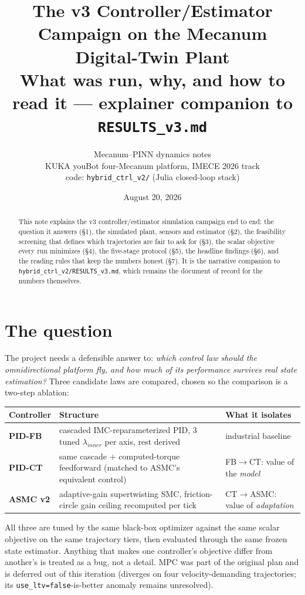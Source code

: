 \documentclass[11pt]{article}
\title{The v3 Controller/Estimator Campaign on the Mecanum Digital-Twin Plant\\
\large What was run, why, and how to read it --- explainer companion to
\texttt{RESULTS\_v3.md}}
\author{Mecanum--PINN dynamics notes\\
\small KUKA youBot four-Mecanum platform, IMECE 2026 track\\
\small code: \texttt{hybrid\_ctrl\_v2/} (Julia closed-loop stack)}
\date{August 20, 2026}
\begin{document}
\maketitle

\begin{abstract}
\noindent
This note explains the v3 controller/estimator simulation campaign end to end: the
question it answers (\S1), the simulated plant, sensors and estimator (\S2), the
feasibility screening that defines which trajectories are fair to ask for (\S3), the
scalar objective every run minimizes (\S4), the five-stage protocol (\S5), the headline
findings (\S6), and the reading rules that keep the numbers honest (\S7). It is the
narrative companion to \texttt{hybrid\_ctrl\_v2/RESULTS\_v3.md}, which remains the
document of record for the numbers themselves.
\end{abstract}

\section{The question}
The project needs a defensible answer to: \emph{which control law should the
omnidirectional platform fly, and how much of its performance survives real state
estimation?} Three candidate laws are compared, chosen so the comparison is a two-step
ablation:

\begin{center}\small
\begin{tabular}{@{}l p{8.6cm} p{4.9cm} @{}}
\toprule
Controller & Structure & What it isolates\\
\midrule
\textbf{PID-FB} & cascaded IMC-reparameterized PID, 3 tuned $\lambda_{inner}$ per axis,
                  rest derived & industrial baseline\\
\textbf{PID-CT} & same cascade $+$ computed-torque feedforward (matched to ASMC's
                  equivalent control) & FB$\to$CT: value of the \emph{model}\\
\textbf{ASMC v2} & adaptive-gain supertwisting SMC, friction-circle gain ceiling
                  recomputed per tick & CT$\to$ASMC: value of \emph{adaptation}\\
\bottomrule
\end{tabular}
\end{center}

All three are tuned by the same black-box optimizer against the same scalar objective on
the same trajectory tiers, then evaluated through the same frozen state estimator.
Anything that makes one controller's objective differ from another's is treated as a bug,
not a detail. MPC was part of the original plan and is deferred out of this iteration
(diverges on four velocity-demanding trajectories; its \texttt{use\_ltv=false}-is-better
anomaly remains unresolved).
\end{document}
